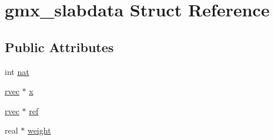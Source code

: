 \hypertarget{structgmx__slabdata}{\section{gmx\-\_\-slabdata \-Struct \-Reference}
\label{structgmx__slabdata}
}
\subsection*{\-Public \-Attributes}
\begin{DoxyCompactItemize}
\item 
int \hyperlink{structgmx__slabdata_a7855792b602b1193fb5e3786fe1055cd}{nat}
\item 
\hyperlink{share_2template_2gromacs_2types_2simple_8h_aa02a552a4abd2f180c282a083dc3a999}{rvec} $\ast$ \hyperlink{structgmx__slabdata_a1551510842bf666c0e790aff87dea9f1}{x}
\item 
\hyperlink{share_2template_2gromacs_2types_2simple_8h_aa02a552a4abd2f180c282a083dc3a999}{rvec} $\ast$ \hyperlink{structgmx__slabdata_a38412c998c5ba1354af37003486baf1e}{ref}
\item 
real $\ast$ \hyperlink{structgmx__slabdata_a710d6be23a5f67c250f9491a8260dfd7}{weight}
\end{DoxyCompactItemize}


